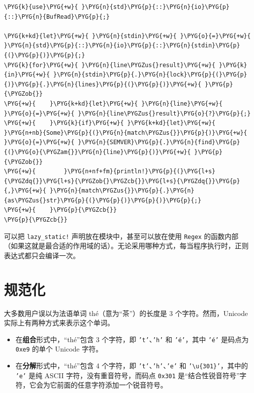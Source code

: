 \begin{Verbatim}[commandchars=\\\{\},breaklines=true,breakanywhere=true,fontsize=\codefont,xleftmargin=17bp]
\PYG{k}{use}\PYG{+w}{ }\PYG{n}{std}\PYG{p}{::}\PYG{n}{io}\PYG{p}{::}\PYG{n}{BufRead}\PYG{p}{;}

\PYG{k+kd}{let}\PYG{+w}{ }\PYG{n}{stdin}\PYG{+w}{ }\PYG{o}{=}\PYG{+w}{ }\PYG{n}{std}\PYG{p}{::}\PYG{n}{io}\PYG{p}{::}\PYG{n}{stdin}\PYG{p}{(}\PYG{p}{)}\PYG{p}{;}
\PYG{k}{for}\PYG{+w}{ }\PYG{n}{line\PYGZus{}result}\PYG{+w}{ }\PYG{k}{in}\PYG{+w}{ }\PYG{n}{stdin}\PYG{p}{.}\PYG{n}{lock}\PYG{p}{(}\PYG{p}{)}\PYG{p}{.}\PYG{n}{lines}\PYG{p}{(}\PYG{p}{)}\PYG{+w}{ }\PYG{p}{\PYGZob{}}
\PYG{+w}{    }\PYG{k+kd}{let}\PYG{+w}{ }\PYG{n}{line}\PYG{+w}{ }\PYG{o}{=}\PYG{+w}{ }\PYG{n}{line\PYGZus{}result}\PYG{o}{?}\PYG{p}{;}
\PYG{+w}{    }\PYG{k}{if}\PYG{+w}{ }\PYG{k+kd}{let}\PYG{+w}{ }\PYG{n+nb}{Some}\PYG{p}{(}\PYG{n}{match\PYGZus{}}\PYG{p}{)}\PYG{+w}{ }\PYG{o}{=}\PYG{+w}{ }\PYG{n}{SEMVER}\PYG{p}{.}\PYG{n}{find}\PYG{p}{(}\PYG{o}{\PYGZam{}}\PYG{n}{line}\PYG{p}{)}\PYG{+w}{ }\PYG{p}{\PYGZob{}}
\PYG{+w}{        }\PYG{n+nf+fm}{println!}\PYG{p}{(}\PYG{l+s}{\PYGZdq{}}\PYG{l+s}{\PYGZob{}\PYGZcb{}}\PYG{l+s}{\PYGZdq{}}\PYG{p}{,}\PYG{+w}{ }\PYG{n}{match\PYGZus{}}\PYG{p}{.}\PYG{n}{as\PYGZus{}str}\PYG{p}{(}\PYG{p}{)}\PYG{p}{)}\PYG{p}{;}
\PYG{+w}{    }\PYG{p}{\PYGZcb{}}
\PYG{p}{\PYGZcb{}}
\end{Verbatim}

可以把 \texttt{lazy\_static!} 声明放在模块中，甚至可以放在使用 \texttt{Regex} 的函数内部（如果这就是最合适的作用域的话）。无论采用哪种方式，每当程序执行时，正则表达式都只会编译一次。

\section{规范化}

大多数用户误以为法语单词 thé（意为“茶”）的长度是 3 个字符。然而，Unicode 实际上有两种方式来表示这个单词。

\begin{itemize}
\item 在\textbf{组合}形式中，“thé”包含 3 个字符，即 \texttt{'t'}、\texttt{'h'} 和 \texttt{'é'}，其中 \texttt{'é'} 是码点为 \texttt{0xe9} 的单个 Unicode 字符。
\item 在\textbf{分解}形式中，“thé”包含 4 个字符，即 \texttt{'t'}、\texttt{'h'}、\texttt{'e'} 和 \texttt{'\textbackslash{}u\{301\}'}，其中的 \texttt{'e'} 是纯 ASCII 字符，没有重音符号，而码点 \texttt{0x301} 是“结合性锐音符号”字符，它会为它前面的任意字符添加一个锐音符号。
\end{itemize}

